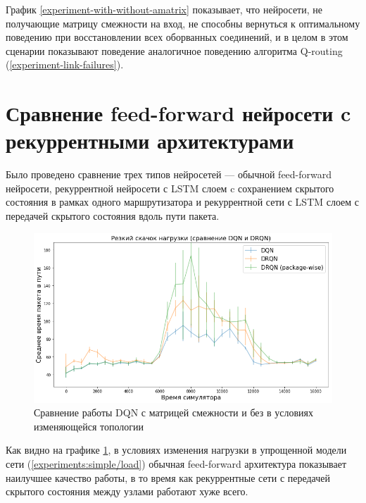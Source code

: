 \documentclass[specification, annotation]{itmo-student-thesis}
\begin{document}
График \ref{experiment-with-without-amatrix} показывает, что нейросети, не
получающие матрицу смежности на вход, не способны вернуться к оптимальному
поведению при восстановлении всех оборванных соединений, и в целом в этом
сценарии показывают поведение аналогичное поведению алгоритма Q-routing
(\ref{experiment-link-failures}).

\section{Сравнение feed-forward нейросети c рекуррентными архитектурами}\label{apx:rnn}

Было проведено сравнение трех типов нейросетей --- обычной feed-forward
нейросети, рекуррентной нейросети с LSTM слоем c сохранением скрытого состояния
в рамках одного маршрутизатора и рекуррентной сети с LSTM слоем с передачей
скрытого состояния вдоль пути пакета.

\begin{figure}[!h]
  \caption{Сравнение работы DQN с матрицей смежности и без в условиях
    изменяющейся топологии}\label{experiment-rnn-comparison}
  \centering
  \includegraphics[scale=0.6]{experiment-rnn-comparison}
\end{figure}

Как видно на графике \ref{experiment-rnn-comparison}, в условиях изменения
нагрузки в упрощенной модели сети (\ref{experiments:simple/load}) обычная
feed-forward архитектура показывает наилучшее качество работы, в то время как
рекуррентные сети с передачей скрытого состояния между узлами работают хуже всего.
\end{document}
